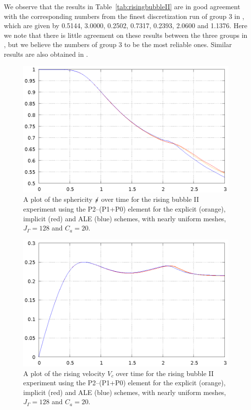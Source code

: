 We observe that the results in Table~\ref{tab:risingbubbleII}
are in good agreement with the corresponding numbers from the finest
discretization run of group 3 in \cite{HysingTKPBGT09}, which are given by
0.5144, 3.0000, 0.2502, 0.7317, 0.2393, 2.0600 and 1.1376. Here we note that
there is little agreement on these results between the three groups in
\cite{HysingTKPBGT09}, but we believe the numbers of group 3 to be the most
reliable ones. Similar results are also obtained in \cite{fluidfbp}.

\begin{figure}[htbp]
\centering
\includegraphics[width=.45\textwidth]
{figures/navier_stokes/rising_bubble_II_sphericity.ps}
\caption[Navier--Stokes rising bubble II sphericity]
{A plot of the sphericity $\mbox{$s\!\!\!\!\:/$}$ over time for the rising bubble II
experiment using the P2--(P1+P0) element for the explicit (orange), implicit
(red) and ALE (blue) schemes, with nearly uniform meshes,
$J_\Gamma=128$ and $C_a=20$\textdegree.}
\label{fig:risingbubbleIIsphericity}
\end{figure}

\begin{figure}[htbp]
\centering
\includegraphics[width=.45\textwidth]
{figures/navier_stokes/rising_bubble_II_rising_velocity.ps}
\caption[Navier--Stokes rising bubble II rising velocity]
{A plot of the rising velocity $V_c$ over time for the rising bubble II
experiment using the P2--(P1+P0) element for the explicit (orange), implicit
(red) and ALE (blue) schemes, with nearly uniform meshes,
$J_\Gamma=128$ and $C_a=20$\textdegree.}
\label{fig:risingbubbleIIrisingvelocity}
\end{figure}


